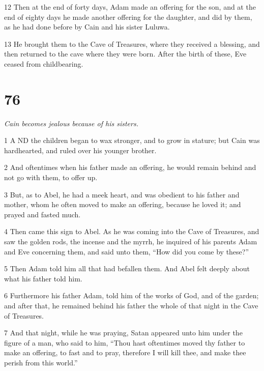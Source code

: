\par 12 Then at the end of forty days, Adam made an offering for the son, and at the end of eighty days he made another offering for the daughter, and did by them, as he had done before by Cain and his sister Luluwa.

\par 13 He brought them to the Cave of Treasures, where they received a blessing, and then returned to the cave where they were born. After the birth of these, Eve ceased from childbearing.

\chapter{76}

\par \textit{Cain becomes jealous because of his sisters.}

\par 1 A ND the children began to wax stronger, and to grow in stature; but Cain was hardhearted, and ruled over his younger brother.

\par 2 And oftentimes when his father made an offering, he would remain behind and not go with them, to offer up.

\par 3 But, as to Abel, he had a meek heart, and was obedient to his father and mother, whom he often moved to make an offering, because he loved it; and prayed and fasted much.

\par 4 Then came this sign to Abel. As he was coming into the Cave of Treasures, and saw the golden rods, the incense and the myrrh, he inquired of his parents Adam and Eve concerning them, and said unto them, “How did you come by these?”

\par 5 Then Adam told him all that had befallen them. And Abel felt deeply about what his father told him.

\par 6 Furthermore his father Adam, told him of the works of God, and of the garden; and after that, he remained behind his father the whole of that night in the Cave of Treasures.

\par 7 And that night, while he was praying, Satan appeared unto him under the figure of a man, who said to him, “Thou hast oftentimes moved thy father to make an offering, to fast and to pray, therefore I will kill thee, and make thee perish from this world.”


